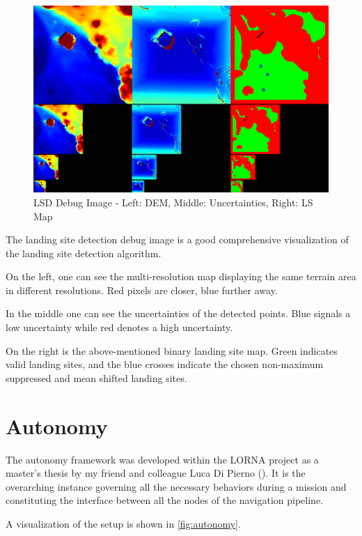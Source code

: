 \begin{figure}[ht!]
    \centering
    \includegraphics[scale=0.25]{images/system_overview/lsd_debug_image.png}
    \caption{LSD Debug Image - Left: DEM, Middle: Uncertainties, Right: LS Map}
    \label{fig:lsd_debug} %
\end{figure}

The landing site detection debug image is a good comprehensive visualization of the landing site detection algorithm. 

On the left, one can see the multi-resolution map displaying the same terrain area in different resolutions. Red pixels are closer, blue further away.

In the middle one can see the uncertainties of the detected points. Blue signals a low uncertainty while red denotes a high uncertainty. 

On the right is the above-mentioned binary landing site map. Green indicates valid landing sites, and the blue crosses indicate the chosen non-maximum suppressed and mean shifted landing sites.   

\section{Autonomy}\label{sec:setup:autonomy}

The autonomy framework was developed within the LORNA project as a master's thesis by my friend and colleague Luca Di Pierno (\citep{Autonomy}). It is the overarching instance governing all the necessary behaviors during a mission and constituting the interface between all the nodes of the navigation pipeline.

A visualization of the setup is shown in \cref{fig:autonomy}.

